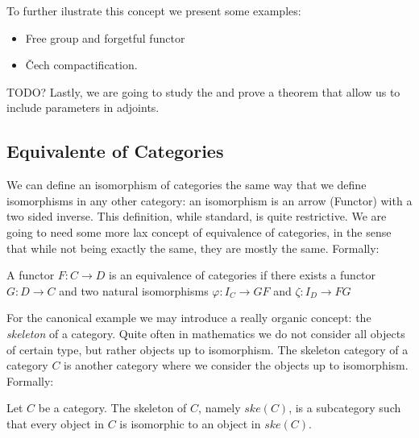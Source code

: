 To further ilustrate this concept we present some examples:
\begin{example}
  \begin{itemize}
  \item Free group and forgetful functor
  \item \v{C}ech compactification.
  \end{itemize}
\end{example}

{\color{red} TODO? Lastly, we are going to study the  and prove a theorem that allow us to include parameters in adjoints.}



\subsection{Equivalente of Categories}
We can define an isomorphism of categories the same way that we define isomorphisms in any other category: an isomorphism is an arrow (Functor) with a two sided inverse. This definition, while standard, is quite restrictive. We are going to need some more lax concept of equivalence of categories, in the sense that while not being exactly the same, they are mostly the same. Formally:

\begin{definition}
A functor $F:C\to D$ is an equivalence of categories if there exists a functor $G:D\to C$  and two natural isomorphisms $\varphi: I_C \to GF$ and $\zeta: I_D\to FG$
\end{definition}


For the canonical example we may introduce a really organic concept: the \emph{skeleton} of a category. Quite often in mathematics we do not consider all objects of certain type, but rather objects up to isomorphism. The skeleton category of a category $C$ is another category where we consider the objects up to isomorphism. Formally:
  \begin{definition}
    Let $C$ be a category. The skeleton of $C$, namely $ske(C)$, is a subcategory  such that every object in $C$ is isomorphic to an object in $ske(C)$.
  \end{definition}

